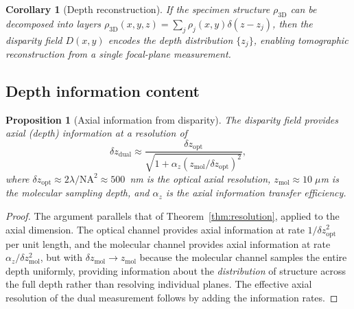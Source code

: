 \documentclass[11pt,twocolumn,a4paper]{article}
\newtheorem{corollary}[theorem]{Corollary}
\newtheorem{proposition}[theorem]{Proposition}
\begin{document}
\begin{corollary}[Depth reconstruction]\label{cor:depth_recon}
If the specimen structure $\rho_{\mathrm{3D}}$ can be decomposed into layers $\rho_{\mathrm{3D}}(x,y,z) = \sum_j \rho_j(x,y) \delta(z - z_j)$, then the disparity field $D(x,y)$ encodes the depth distribution $\{z_j\}$, enabling tomographic reconstruction from a single focal-plane measurement.
\end{corollary}

\subsection{Depth information content}

\begin{proposition}[Axial information from disparity]\label{prop:axial_info}
The disparity field provides axial (depth) information at a resolution of
\begin{equation}\label{eq:axial_resolution}
\delta z_{\mathrm{dual}} \approx \frac{\delta z_{\mathrm{opt}}}{\sqrt{1 + \alpha_z (z_{\mathrm{mol}}/\delta z_{\mathrm{opt}})^2}},
\end{equation}
where $\delta z_{\mathrm{opt}} \approx 2\lambda / \mathrm{NA}^2 \approx 500$~nm is the optical axial resolution, $z_{\mathrm{mol}} \approx 10\;\mu$m is the molecular sampling depth, and $\alpha_z$ is the axial information transfer efficiency.
\end{proposition}
\begin{proof}
The argument parallels that of Theorem~\ref{thm:resolution}, applied to the axial dimension.
The optical channel provides axial information at rate $1/\delta z_{\mathrm{opt}}^2$ per unit length, and the molecular channel provides axial information at rate $\alpha_z / \delta z_{\mathrm{mol}}^2$, but with $\delta z_{\mathrm{mol}} \to z_{\mathrm{mol}}$ because the molecular channel samples the entire depth uniformly, providing information about the \emph{distribution} of structure across the full depth rather than resolving individual planes.
The effective axial resolution of the dual measurement follows by adding the information rates.
\end{proof}

\end{document}
